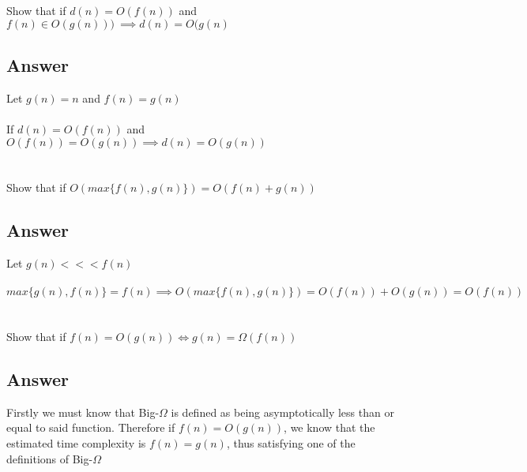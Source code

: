 \documentclass{article}
\begin{document}
Show that if \(d(n) = O(f(n))\) and \(f(n) \in O(g(n)))\ \implies d(n) = O(g(n)\)

\subsection{Answer}

\begin{mdframed}
  Let \(g(n) = n\) and \(f(n) = g(n)\) \\ \\
  If \(d(n) = O(f(n))\) and \( O(f(n)) = O(g(n)) \implies d(n) = O(g(n)) \)

\end{mdframed}


\section{}

Show that if \(O(max\{f(n), g(n)\}) = O(f(n) + g(n))\)

\subsection{Answer}

\begin{mdframed}
  Let \(g(n) <<< f(n)\) \\ \\
  \(max\{g(n), f(n)\} = f(n) \implies O(max\{f(n), g(n)\}) = O(f(n)) + O(g(n)) = O(f(n)) \) 

\end{mdframed}



\section{}

Show that if \(f(n) = O(g(n)) \iff g(n) = \Omega(f(n)) \)

\subsection{Answer}

\begin{mdframed}

  Firstly we must know that Big-\(\Omega\) is defined as being asymptotically less
  than or equal to said function. Therefore if \(f(n) =  O(g(n))\), we know that
  the estimated time complexity is \(f(n) = g(n)\), thus satisfying one of the
  definitions of Big-\(\Omega\)

\end{mdframed}
\end{document}
